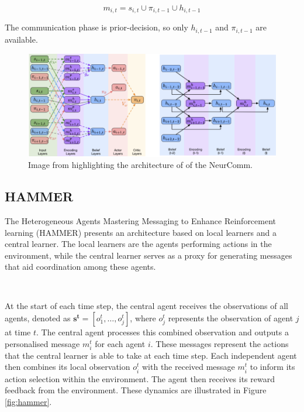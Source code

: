 \documentclass{article}
\begin{document}
\begin{equation}
	m_{i,t} = s_{i,t} \cup \pi_{i,t−1} \cup h_{i,t−1}
\end{equation}

The communication phase is prior-decision, so only $h_{i,t−1}$ and $\pi_{i,t−1}$ are available.

\begin{figure}
	\centering
	\includegraphics[scale=0.5]{images/neurcomm}
	\caption{Image from \citet{chu2020NeurComm} highlighting the architecture of of the NeurComm.}
	\label{fig:neurcomm}
\end{figure}

\subsection{HAMMER}

The Heterogeneous Agents Mastering Messaging to Enhance Reinforcement learning (HAMMER) \citep{gupta2022HAMMER} presents an architecture based on local learners and a central learner. The local learners are the agents performing actions in the environment, while the central learner serves as a proxy for generating messages that aid coordination among these agents. 

\

At the start of each time step, the central agent receives the observations of all agents, denoted as $\mathbf{s^t} = [o_1^t, \hdots, o_j^t]$, where $o_j^t$ represents the observation of agent $j$ at time $t$. The central agent processes this combined observation and outputs a personalised message $m_i^t$ for each agent $i$. These messages represent the actions that the central learner is able to take at each time step. Each independent agent then combines its local observation $o_i^t$ with the received message $m_i^t$ to inform its action selection within the environment. The agent then receives its reward feedback from the environment. These dynamics are illustrated in Figure \ref{fig:hammer}.
\end{document}
